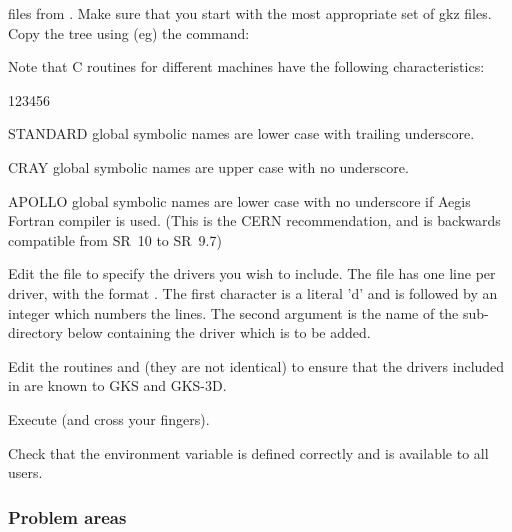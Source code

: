 \begin{OL}
files from . Make sure that you start with the most
appropriate set of gkz files. Copy the tree using (eg) the command:
Note that C routines for different machines have the following
characteristics:
\begin{DLtt}{123456}
\item[STANDARD]global symbolic names are lower case with trailing underscore.
\item[CRAY]global symbolic names are upper case with no underscore.
\item[APOLLO]global symbolic names are lower case with no underscore
if Aegis Fortran compiler is used. (This is the CERN recommendation,
and is backwards compatible from SR~10 to SR~9.7)
\end{DLtt}
\item
Edit the file  to specify the drivers you wish to include.
The file has one line per driver, with the format .
The first character is a literal 'd' and is followed by an integer
which numbers the lines. The second argument is the name of the
sub-directory below  containing the driver which
is to be added.
\item
Edit the routines  and
 (they are not identical) to ensure
that the drivers included in  are known to GKS and GKS-3D.
\item
Execute  (and cross your fingers).
\item
Check that the environment variable  is defined correctly
and is available to all users.
\end{OL}
\subsubsection{Problem areas}
 
